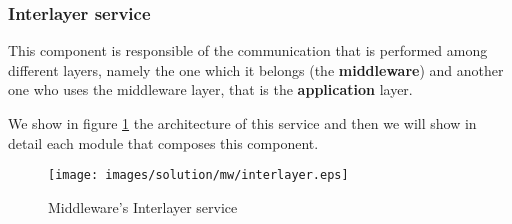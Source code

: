 \subsubsection{Interlayer service}

This component is responsible of the communication that is performed among
different layers, namely the one which it belongs (the \textbf{middleware}) and
another one who uses the middleware layer, that is the \textbf{application}
layer.

We show in figure \ref{fig:mw-interlayer} the architecture of this service and
then we will show in detail each module that composes this component.

\begin{figure}[H]
  \centering
  \texttt{[image: images/solution/mw/interlayer.eps]}
  \caption{Middleware's Interlayer service}
  \label{fig:mw-interlayer}
\end{figure} %









